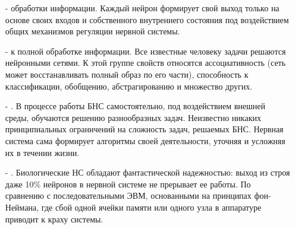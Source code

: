 \begin{itemize}
\item[-] { обработки информации. }
Каждый нейрон формирует свой выход только на основе своих входов и собственного внутреннего состояния под воздействием общих механизмов регуляции нервной системы.
\item[-] { к полной обработке информации. }
Все известные человеку задачи решаются нейронными сетями.
К этой группе свойств относятся ассоциативность (сеть может восстанавливать полный образ по его части), способность к классификации, обобщению, абстрагированию и множество других.
\item[-] {.}
В процессе работы БНС самостоятельно, под воздействием внешней среды, обучаются решению разнообразных задач.
Неизвестно никаких принципиальных ограничений на сложность задач, решаемых БНС.
Нервная система сама формирует алгоритмы своей деятельности, уточняя и усложняя их в течении жизни.
\item[-] {. }
Биологические НС обладают фантастической надежностью: выход из строя даже 10\% нейронов в нервной системе не прерывает ее работы. 
По сравнению с последовательными ЭВМ, основанными на принципах фон-Неймана, где сбой одной ячейки памяти или одного узла в аппаратуре приводит к краху системы.\cite{COURSE}
\end{itemize}

